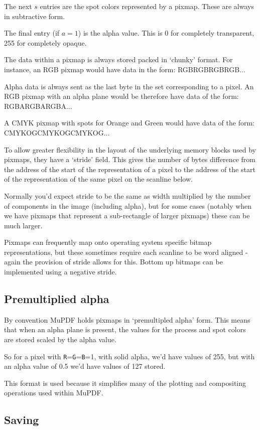 \documentclass[oneside]{book}
\begin{document}
The next $s$ entries are the spot colors represented by a pixmap. These are always in subtractive form.

The final entry (if $a = 1$) is the alpha value. This is 0 for completely transparent, 255 for completely opaque.

The data within a pixmap is always stored packed in `chunky' format. For instance, an RGB pixmap would have data in the form: RGBRGBRGBRGB...

Alpha data is always sent as the last byte in the set corresponding to a pixel. An RGB pixmap with an alpha plane would be therefore have data of the form: RGBARGBARGBA...

A CMYK pixmap with spots for Orange and Green would have data of the form: CMYKOGCMYKOGCMYKOG...

To allow greater flexibility in the layout of the underlying memory blocks used by pixmaps, they have a `stride' field. This gives the number of bytes difference from the address of the start of the representation of a pixel to the address of the start of the representation of the same pixel on the scanline below.

Normally you'd expect stride to be the same as width multiplied by the number of components in the image (including alpha), but for some cases (notably when we have pixmaps that represent a sub-rectangle of larger pixmaps) these can be much larger.

Pixmaps can frequently map onto operating system specific bitmap representations, but these sometimes require each scanline to be word aligned - again the provision of stride allows for this. Bottom up bitmaps can be implemented using a negative stride.

\subsection{Premultiplied alpha}

By convention MuPDF holds pixmaps in `premultipled alpha' form. This means that when an alpha plane is present, the values for the process and spot colors are stored scaled by the alpha value.

So for a pixel with \texttt{R}=\texttt{G}=\texttt{B}=1, with solid alpha, we'd have values of 255, but with an alpha value of 0.5 we'd have values of 127 stored.

This format is used because it simplifies many of the plotting and compositing operations used within MuPDF.

\subsection{Saving}
\end{document}
